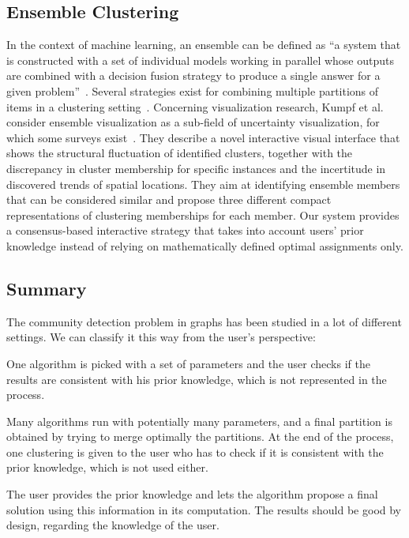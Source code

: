 \subsection{Ensemble Clustering}

In the context of machine learning, an ensemble can be defined as ``a system that is constructed with a set of individual models working in parallel whose outputs are combined with a decision fusion strategy to produce a single answer for a given problem''~\cite{wangFundamentalIssuesEnsemble2008}. Several strategies exist for combining multiple partitions of items in a clustering setting~\cite{strehl2002cluster}.
Concerning visualization research, Kumpf et al.~\cite{kumpfVisualizingConfidenceClusterBased2018} consider ensemble visualization as a sub-field of uncertainty visualization, for which some surveys exist~\cite{bonneauOverviewStateoftheArtUncertainty2014, maceachrenVisualizingGeospatialInformation2005}. They describe a novel interactive visual interface that shows the structural fluctuation of identified clusters, together with the discrepancy in cluster membership for specific instances and the incertitude in discovered trends of spatial locations.
They aim at identifying ensemble members that can be considered similar and propose three different compact representations of clustering memberships for each member.
Our system provides a consensus-based interactive strategy that takes into account users' prior knowledge instead of relying on mathematically defined optimal assignments only.

\subsection{Summary}\label{sec:summary}

The community detection problem in graphs has been studied in a lot of different settings. We can classify it this way from the user's perspective:
\begin{description}[leftmargin=0pt,nosep]
\item [Standard clustering.] One algorithm is picked with a set of parameters and the user checks if the results are consistent with his prior knowledge, which is not represented in the process.
\item [Ensemble clustering.] Many algorithms run with potentially many parameters, and a final partition is obtained by trying to merge optimally the partitions. At the end of the process, one clustering is given to the user who has to check if it is consistent with the prior knowledge, which is not used either.
\item [Semi-supervised clustering.] The user provides the prior knowledge and lets the algorithm propose a final solution using this information in its computation. The results should be good by design, regarding the knowledge of the user.
\end{description}


